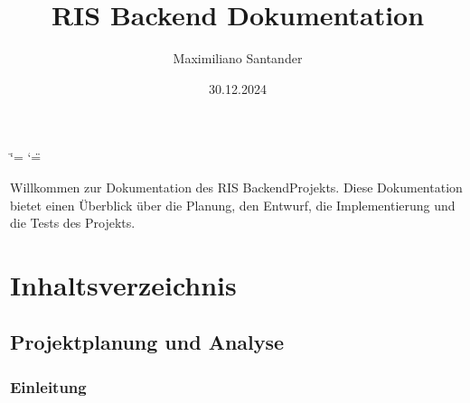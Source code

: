 \documentclass[a4paper,12pt,ngerman]{sphinxmanual}
\title{RIS Backend Dokumentation}
\date{30.12.2024}
\author{Maximiliano Santander}
\begin{document}
\ifdefined\shorthandoff
  \ifnum\catcode`\=\string=\active\shorthandoff{=}\fi
  \ifnum\catcode`\"=\active{}\fi
\fi

\pagestyle{empty}
\sphinxmaketitle
\pagestyle{plain}
\sphinxtableofcontents
\pagestyle{normal}
\label{\detokenize{index::doc}}


\sphinxAtStartPar
Willkommen zur Dokumentation des RIS Backend\sphinxhyphen{}Projekts. Diese Dokumentation bietet einen Überblick über die Planung, den Entwurf, die Implementierung und die Tests des Projekts.


\chapter{Inhaltsverzeichnis}
\label{\detokenize{index:inhaltsverzeichnis}}
\sphinxstepscope


\section{Projektplanung und Analyse}
\label{\detokenize{sections/projektplanung_analyse:projektplanung-und-analyse}}\label{\detokenize{sections/projektplanung_analyse::doc}}

\subsection{Einleitung}
\label{\detokenize{sections/projektplanung_analyse:einleitung}}
\end{document}
